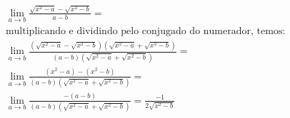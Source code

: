 \begin{ex}
\begin{align}
&\lim_{a\rightarrow b} \frac{\sqrt{x^2-a}-\sqrt{x^2-b}}{a-b}=\nonumber\\
&\text{multiplicando e dividindo pelo conjugado do numerador, temos:}\nonumber\\
&\lim_{a\rightarrow b} \frac{(\sqrt{x^2-a}-\sqrt{x^2-b})(\sqrt{x^2-a}+\sqrt{x^2-b})}{(a-b)(\sqrt{x^2-a}+\sqrt{x^2-b})}=\nonumber\\
&\lim_{a\rightarrow b} \frac{(x^2-a)-(x^2-b)}{(a-b)(\sqrt{x^2-a}+\sqrt{x^2-b})}=\nonumber\\
&\lim_{a\rightarrow b} \frac{-(a-b)}{(a-b)(\sqrt{x^2-a}+\sqrt{x^2-b})}=\frac{-1}{2\sqrt{x^2-b}}\nonumber
\end{align}
\end{ex}
